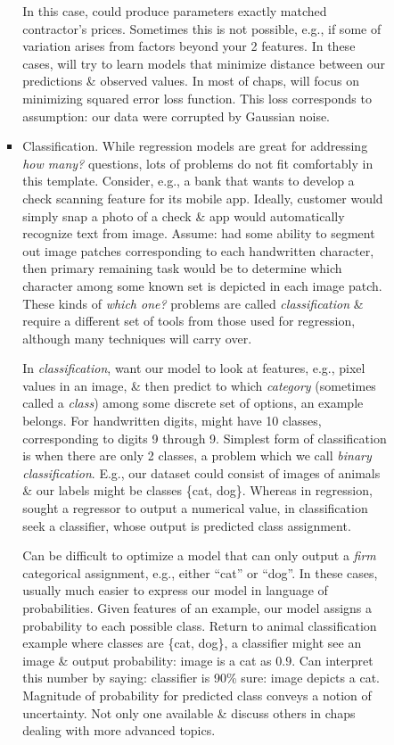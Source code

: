 \documentclass{article}
\begin{document}
\begin{itemize}
\begin{itemize}
\begin{itemize}
\begin{itemize}
				In this case, could produce parameters exactly matched contractor's prices. Sometimes this is not possible, e.g., if some of variation arises from factors beyond your 2 features. In these cases, will try to learn models that minimize distance between our predictions \& observed values. In most of chaps, will focus on minimizing squared error loss function. This loss corresponds to assumption: our data were corrupted by Gaussian noise.
				\item {\sf Classification.} While regression models are great for addressing {\it how many?} questions, lots of problems do not fit comfortably in this template. Consider, e.g., a bank that wants to develop a check scanning feature for its mobile app. Ideally, customer would simply snap a photo of a check \& app would automatically recognize text from image. Assume: had some ability to segment out image patches corresponding to each handwritten character, then primary remaining task would be to determine which character among some known set is depicted in each image patch. These kinds of {\it which one?} problems are called {\it classification} \& require a different set of tools from those used for regression, although many techniques will carry over.
				
				In {\it classification}, want our model to look at features, e.g., pixel values in an image, \& then predict to which {\it category} (sometimes called a {\it class}) among some discrete set of options, an example belongs. For handwritten digits, might have 10 classes, corresponding to digits 9 through 9. Simplest form of classification is when there are only 2 classes, a problem which we call {\it binary classification}. E.g., our dataset could consist of images of animals \& our labels might be classes \{cat, dog\}. Whereas in regression, sought a regressor to output a numerical value, in classification seek a classifier, whose output is predicted class assignment.
				
				Can be difficult to optimize a model that can only output a {\it firm} categorical assignment, e.g., either ``cat'' or ``dog''. In these cases, usually much easier to express our model in language of probabilities. Given features of an example, our model assigns a probability to each possible class. Return to animal classification example where classes are \{cat, dog\}, a classifier might see an image \& output probability: image is a cat as $0.9$. Can interpret this number by saying: classifier is 90\% sure: image depicts a cat. Magnitude of probability for predicted class conveys a notion of uncertainty. Not only one available \& discuss others in chaps dealing with more advanced topics.
				

\end{itemize}
\end{itemize}
\end{itemize}
\end{itemize}
\end{document}
